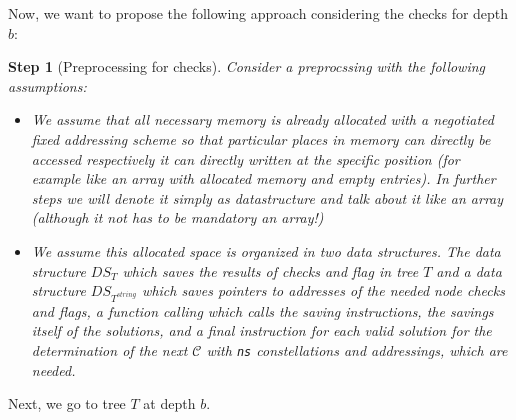 \documentclass{article}
\newtheorem*{theorem A}{Theorem A}
\newtheorem*{theorem B}{N\"olker's Theorem}
\newtheorem{step}{Step}
\theoremstyle{remark}
\theoremstyle{remark}
\begin{document}
Now, we want to propose the following approach considering the checks for depth $b$:

\begin{step}[Preprocessing for checks]

    Consider a preprocssing with the following assumptions:

    \begin{itemize}
        \item We assume that all necessary memory is already allocated with a negotiated fixed addressing scheme so that particular places in memory can directly be accessed respectively it can directly written at the specific position (for example like an array with allocated memory and empty entries). In further steps we will denote it simply as datastructure and talk about it like an array (although it not has to be mandatory an array!)

        \item We assume this allocated space is organized in two data structures. The data structure $DS_{T}$ which saves the results of checks and flag in tree $T$ and a data structure $DS_{T^{string}}$ which saves pointers to addresses of the needed node checks and flags, a function calling which calls the saving instructions, the savings itself of the solutions, and a final instruction for each valid solution for the determination of the next $\mathcal{C}$ with \texttt{ns} constellations and addressings, which are needed.

    \end{itemize}

\label{step:preprocessingforchecks}
\end{step}

Next, we go to tree $T$ at depth $b$.
\end{document}
